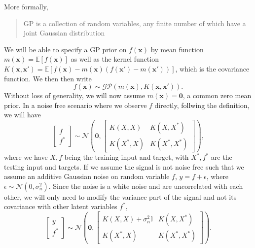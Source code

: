 \documentclass{statsmsc}
\begin{document}
More formally, \begin{quote}GP is a collection of random variables, any finite number of which have a joint Gaussian distribution\end{quote}
We will be able to specify a GP prior on $f(\mathbf{x})$ by mean function $m(\mathbf{x})=\mathbb{E}[f(\mathbf{x})]$ as well as the kernel function $K(\mathbf{x}, \mathbf{x'})=\mathbb{E}[f(\mathbf{x})-m(\mathbf{x})(f(\mathbf{x'})-m(\mathbf{x'}))]$, which is the covariance function.
We then then write
$$
f(\mathbf{x})\sim\mathcal{GP}(m(\mathbf{x}),K(\mathbf{x},\mathbf{x'})).
$$
Without loss of generality, we will now assume $m(\mathbf{x})=\mathbf{0}$, a common zero mean prior.
In a noise free scenario where we observe $f$ directly, follwing the definition, we will have
$$
\begin{bmatrix}
  f\\f^*
\end{bmatrix}
\sim \mathcal{N}
\left(\mathbf{0}, \begin{bmatrix}K(X, X) & K(X, X^*) \\ K(X^*, X) & K(X^*, X^*) \end{bmatrix}\right),
$$
where we have $X, f$ being the training input and target, with $X^*, f^*$ are the testing input and targets.
If we assume the signal is not noise free such that we assume an additive Gaussian noise on random variable $f$, $y=f+\epsilon$, where $\epsilon\sim\mathcal{N}(0, \sigma_n^2)$.
Since the noise is a white noise and are uncorrelated with each other, we will only need to modify the variance part of the signal and not its covariance with other latent variables $f^*$,
\begin{equation}
\begin{bmatrix}
  y\\f^*
\end{bmatrix}
\sim \mathcal{N}
\left(\mathbf{0}, \begin{bmatrix}K(X, X)+\sigma^2_n\mathbb{I} & K(X, X^*) \\ K(X^*, X) & K(X^*, X^*) \end{bmatrix}\right).
\label{equ:joint_gp_noise}
\end{equation}
\end{document}
